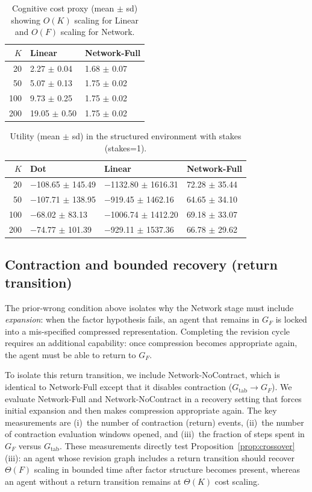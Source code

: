 \documentclass[11pt]{article}
\begin{document}
\begin{table}[t]
\caption{Cognitive cost proxy (mean $\pm$ sd) showing $O(K)$ scaling for Linear and $O(F)$ scaling for Network.}
\label{tab:cog_scaling}
\centering
\begin{tabular}{rll}
\toprule
$K$ & Linear & Network-Full \\
\midrule
20 & 2.27 $\pm$ 0.04 & 1.68 $\pm$ 0.07 \\
50 & 5.07 $\pm$ 0.13 & 1.75 $\pm$ 0.02 \\
100 & 9.73 $\pm$ 0.25 & 1.75 $\pm$ 0.02 \\
200 & 19.05 $\pm$ 0.50 & 1.75 $\pm$ 0.02 \\
\bottomrule
\end{tabular}
\end{table}

\begin{table}[t]
\caption{Utility (mean $\pm$ sd) in the structured environment with stakes (stakes=1).}
\label{tab:util_struct1}
\centering
\begin{tabular}{rlll}
\toprule
$K$ & Dot & Linear & Network-Full \\
\midrule
20 & $-$108.65 $\pm$ 145.49 & $-$1132.80 $\pm$ 1616.31 & 72.28 $\pm$ 35.44 \\
50 & $-$107.71 $\pm$ 138.95 & $-$919.45 $\pm$ 1462.16 & 64.65 $\pm$ 34.10 \\
100 & $-$68.02 $\pm$ 83.13 & $-$1006.74 $\pm$ 1412.20 & 69.18 $\pm$ 33.07 \\
200 & $-$74.77 $\pm$ 101.39 & $-$929.11 $\pm$ 1537.36 & 66.78 $\pm$ 29.62 \\
\bottomrule
\end{tabular}
\end{table}


\subsection{Contraction and bounded recovery (return transition)}\label{sec:contraction}

The prior-wrong condition above isolates why the Network stage must include
\emph{expansion}: when the factor hypothesis fails, an agent that remains in
$G_F$ is locked into a mis-specified compressed representation.  Completing the
revision cycle requires an additional capability: once compression becomes
appropriate again, the agent must be able to return to $G_F$.

To isolate this return transition, we include Network-NoContract, which is
identical to Network-Full except that it disables contraction
($G_{\mathrm{tab}}\rightarrow G_F$).  We evaluate Network-Full and
Network-NoContract in a recovery setting that forces initial expansion and then
makes compression appropriate again.  The key measurements are
(i)~the number of contraction (return) events,
(ii)~the number of contraction evaluation windows opened, and
(iii)~the fraction of steps spent in $G_F$ versus $G_{\mathrm{tab}}$.
These measurements directly test Proposition~\ref{prop:crossover}(iii): an agent
whose revision graph includes a return transition should recover $\Theta(F)$
scaling in bounded time after factor structure becomes present, whereas an
agent without a return transition remains at $\Theta(K)$ cost scaling.
\end{document}
